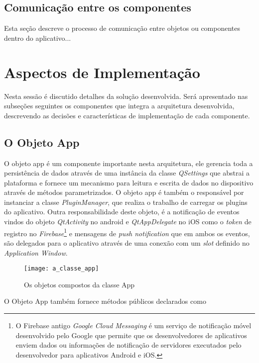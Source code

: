 \subsection{Comunicação entre os componentes}
Esta seção descreve o processo de comunicação entre objetos ou componentes dentro do aplicativo...


\section{Aspectos de Implementação}\label{sec:solucao-desenvolvida}
Nesta sessão é discutido detalhes da solução desenvolvida. Será apresentado nas subseções seguintes os componentes que integra a arquitetura desenvolvida, descrevendo as decisões e características de implementação de cada componente.



\subsection{O Objeto App}\label{sec:solucao-desenvolvida}
O objeto app é um componente importante nesta arquitetura, ele gerencia toda a persistência de dados através de uma instância da classe \textit{QSettings} que abstrai a plataforma e fornece um mecanismo para leitura e escrita de dados no dispositivo através de métodos parametrizados. O objeto app é também o responsável por instanciar a classe \textit{PluginManager}, que realiza o trabalho de carregar os plugins do aplicativo. Outra responsabilidade deste objeto, é a notificação de eventos vindos do objeto \textit{QtActivity} no android e \textit{QtAppDelegate} no iOS como o \textit{token} de registro no \textit{Firebase}\footnote{O Firebase antigo \textit{Google Cloud Messaging} é um serviço de notificação móvel desenvolvido pelo Google que permite que os desenvolvedores de aplicativos enviem dados ou informações de notificação de servidores executados pelo desenvolvedor para aplicativos Android e iOS.} e mensagens de \textit{push notification} que em ambos os eventos, são delegados para o aplicativo através de uma conexão com um \textit{slot} definido no \textit{Application Window}.

\begin{figure}[h]
	\texttt{[image: a\_classe\_app]}
	\centering
	\caption{Os objetos compostos da classe App}
\end{figure}

O Objeto App também fornece métodos públicos declarados como 


